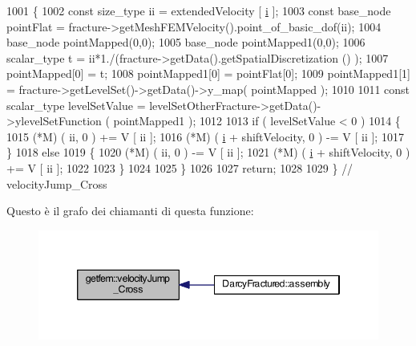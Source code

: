 \begin{DoxyCode}
1001     \{
1002         \textcolor{keyword}{const} size\_type ii = extendedVelocity [ \hyperlink{matrici_8m_a6f6ccfcf58b31cb6412107d9d5281426}{i} ];
1003         \textcolor{keyword}{const} base\_node pointFlat = fracture->getMeshFEMVelocity().point\_of\_basic\_dof(ii);
1004         base\_node pointMapped(0,0);
1005         base\_node pointMapped1(0,0);
1006     scalar\_type t = ii*1./(fracture->getData().getSpatialDiscretization () );
1007         pointMapped[0] = t;
1008         pointMapped1[0] = pointFlat[0];
1009         pointMapped1[1] = fracture->getLevelSet()->getData()->y\_map( pointMapped );
1010 
1011     \textcolor{keyword}{const} scalar\_type levelSetValue = levelSetOtherFracture->getData()->ylevelSetFunction ( pointMapped1 );
1012 
1013         \textcolor{keywordflow}{if} ( levelSetValue < 0 )
1014         \{
1015             (*M) ( ii, 0 ) += V [ ii ];
1016             (*M) ( \hyperlink{matrici_8m_a6f6ccfcf58b31cb6412107d9d5281426}{i} + shiftVelocity, 0 ) -= V [ ii ];
1017         \}
1018         \textcolor{keywordflow}{else}
1019         \{
1020             (*M) ( ii, 0 ) -= V [ ii ];
1021             (*M) ( \hyperlink{matrici_8m_a6f6ccfcf58b31cb6412107d9d5281426}{i} + shiftVelocity, 0 ) += V [ ii ];
1022 
1023         \}
1024 
1025     \}
1026     
1027     \textcolor{keywordflow}{return};
1028 
1029 \} \textcolor{comment}{// velocityJump\_Cross}
\end{DoxyCode}


Questo è il grafo dei chiamanti di questa funzione\-:\nopagebreak
\begin{figure}[H]
\begin{center}
\leavevmode
\includegraphics[width=346pt]{namespacegetfem_acc74b86734c3814042e614d015f23876_icgraph}
\end{center}
\end{figure}


